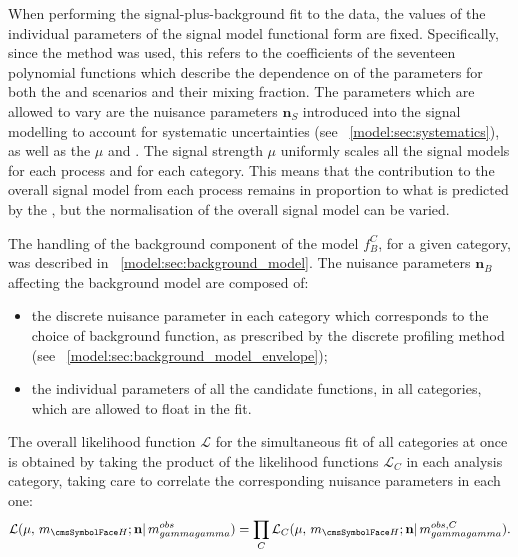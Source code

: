 When performing the signal-plus-background fit to the data, the values of the individual parameters of the signal model functional form are fixed. Specifically, since the \SSF method was used, this refers to the coefficients of the seventeen polynomial functions which describe the dependence on \mH of the \DCBpG parameters for both the \RV and \WV scenarios and their mixing fraction. The parameters which are allowed to vary are the nuisance parameters $\mathbf{n}_S$ introduced into the signal modelling to account for systematic uncertainties (see \Sec~\ref{model:sec:systematics}), as well as the \POI\s $\mu$ and \mH. The signal strength $\mu$ uniformly scales all the signal models for each process and for each category. This means that the contribution to the overall signal model from each process remains in proportion to what is predicted by the \SM, but the normalisation of the overall signal model can be varied.

The handling of the background component of the model $f^C_B$, for a given category, was described in \Sec~\ref{model:sec:background_model}. The nuisance parameters $\mathbf{n}_B$ affecting the background model are composed of:
\begin{itemize}
\item the discrete nuisance parameter in each category which corresponds to the choice of background function, as prescribed by the discrete profiling method (see \Sec~\ref{model:sec:background_model_envelope}); 
\item the individual parameters of all the candidate functions, in all categories, which are allowed to float in the fit.
\end{itemize}

The overall likelihood function $\mathcal{L}$ for the simultaneous fit of all categories at once is obtained by taking the product of the likelihood functions $\mathcal{L}_C$ in each analysis category, taking care to correlate the corresponding nuisance parameters in each one:
\begin{equation}
\label{eq:statandresults:likelihood_function_product}
\mathcal{L}(\mu, \mH; \mathbf{n} | \mgg^{obs} ) = \prod_{C} \mathcal{L}_C(\mu, \mH; \mathbf{n} | \mgg^{obs,C} ).
\end{equation}

